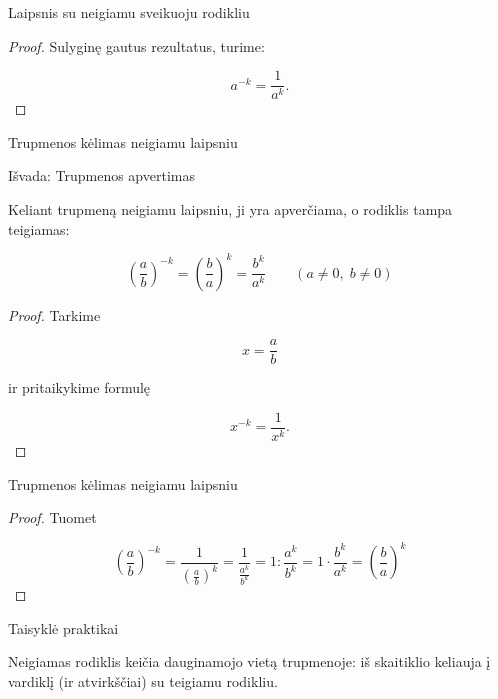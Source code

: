 \documentclass[aspectratio=169,10pt]{beamer}
\begin{document}
\begin{frame}{Laipsnis su neigiamu sveikuoju rodikliu}

    \begin{proof}

        Sulyginę gautus rezultatus, turime:

        \[
        a^{-k}=\frac{1}{a^k}.
        \]

    \end{proof}

\end{frame}


\begin{frame}{Trupmenos kėlimas neigiamu laipsniu}

    \begin{block}{Išvada: Trupmenos apvertimas}

        Keliant trupmeną neigiamu laipsniu,
        ji yra apverčiama, o rodiklis tampa teigiamas:

        \[
        \left(\frac{a}{b}\right)^{-k}
        =
        \left(\frac{b}{a}\right)^k
        =
        \frac{b^k}{a^k}
        \qquad
        (a\neq0,\;b\neq0)
        \]

    \end{block}

    \begin{proof}

        Tarkime

        \[
        x=\frac{a}{b}
        \]

        ir pritaikykime formulę

        \[
        x^{-k}=\frac{1}{x^k}.
        \]

    \end{proof}

\end{frame}

\begin{frame}{Trupmenos kėlimas neigiamu laipsniu}

    \begin{proof}

        Tuomet

        \[
        \left(\frac{a}{b}\right)^{-k}
        =
        \frac{1}
        {\left(\frac{a}{b}\right)^k}
        =
        \frac{1}
        {\frac{a^k}{b^k}}
        =
        1:\frac{a^k}{b^k}
        =
        1\cdot\frac{b^k}{a^k}
        =
        \left(\frac{b}{a}\right)^k
        \]

    \end{proof}

    \begin{alertblock}{Taisyklė praktikai}

        Neigiamas rodiklis keičia dauginamojo vietą trupmenoje:
        iš skaitiklio keliauja į vardiklį
        (ir atvirkščiai) su teigiamu rodikliu.

    \end{alertblock}

\end{frame}
\end{document}
